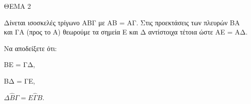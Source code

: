 
ΘΕΜΑ 2

Δίνεται ισοσκελές τρίγωνο ΑΒΓ με ΑΒ = ΑΓ. Στις προεκτάσεις των πλευρών ΒΑ και ΓΑ (προς το Α) θεωρούμε τα σημεία Ε και Δ αντίστοιχα τέτοια ώστε ΑΕ = ΑΔ.

Να αποδείξετε ότι:

\begin{alist}
\item ΒΕ = ΓΔ, 

\item ΒΔ = ΓΕ, 

\item $\Delta\widehat{Β}\Gamma = Ε\widehat{\Gamma}Β$. 
\end{alist}

